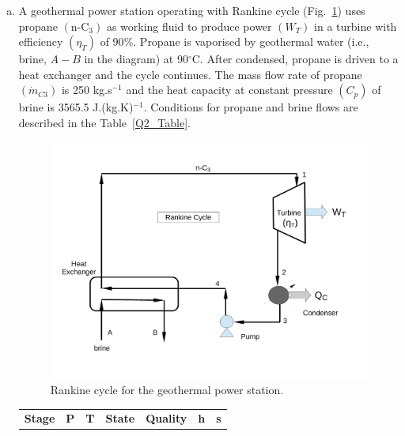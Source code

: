\documentclass[calculator,steamtables,refrigeranttables,psychrometricchart,datasheet,solutions]{exam}
\begin{document}
\begin{question}
%
\begin{enumerate}[(a)]
\item  A geothermal power station operating with Rankine cycle (Fig.~\ref{exam1_Q2_rankinecycle}) uses propane $\left(\text{n-C}_{3}\right)$ as working fluid to produce power $\left(W_{T}\right)$ in a turbine with efficiency $\left(\eta_{T}\right)$ of 90$\%$. Propane is vaporised by geothermal water (i.e., brine, $A-B$ in the diagram) at 90$^{\circ}$C. After condensed, propane is driven to a heat exchanger and the cycle continues. The mass flow rate of propane $\left(\dot{m}_{C3}\right)$ is 250 kg.s$^{-1}$ and the heat capacity at constant pressure $\left(C_{p}\right)$ of brine is 3565.5 J.(kg.K)$^{-1}$. Conditions for propane and brine flows are described in the Table~\ref{Q2_Table}.
\begin{figure}[h!]
\begin{center}
\includegraphics[width=12.cm,height=10.cm,clip]{./Pics/RankineCycle}
\caption{Rankine cycle for the geothermal power station.}
\label{exam1_Q2_rankinecycle}
\end{center} 
\end{figure}
\begin{table}[h]
\begin{center}
\begin{tabular} {||c | c c c c c c || }
\hline\hline
{\bf Stage} & {\bf P}    & {\bf T}        & {\bf State}    &  {\bf Quality }     &  {\bf h}             & {\bf s}                  \\

\end{tabular}
\end{center}
\end{table}
\end{enumerate}
\end{question}
\end{document}
